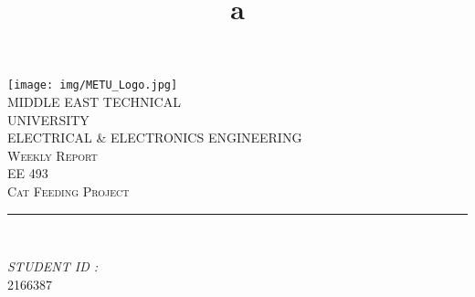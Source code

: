\documentclass[12pt]{article}
\title{a}
\begin{document}

\begin{titlepage}
	\centering
    \vspace*{0.5 cm}
    \texttt{[image: img/METU\_Logo.jpg]}\\[0.5 cm]	%
    \textsc{\Large MIDDLE EAST TECHNICAL} \\[0.2 cm]
    \textsc{\Large UNIVERSITY} \\ [1.0 cm]
    \textsc{\large ELECTRICAL \& ELECTRONICS ENGINEERING} \\[0.2 cm]
    \textsc{\large Weekly Report \weekNum}\\[0.2 cm]
	\textsc{\large EE 493}\\[0.5 cm]				%
	\textsc{\large Cat Feeding Project}\\[0.2 cm]
	\rule{\linewidth}{0.2 mm} \\[0.2 cm]
	
	\begin{minipage}{0.4\textwidth}
		
			\begin{flushright} 
			\emph{STUDENT ID :} \\
			2166387\linebreak
		\end{flushright}
	\end{minipage}\\[2 cm]
	
	\vfill
	
\end{titlepage}


\tableofcontents











\end{document}
